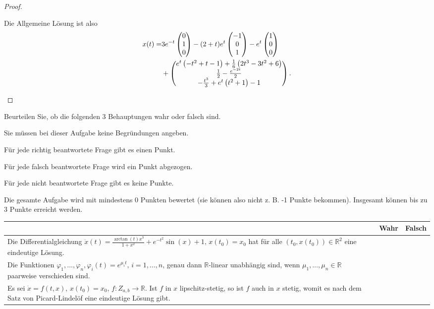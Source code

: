 \begin{proof}
\begin{parts}
Die Allgemeine L\"{o}sung ist also
\begin{align*}
	x(t)=&3e^{-t}\begin{pmatrix}
		0 \\ 1 \\ 0
	\end{pmatrix}-(2+t)e^{t}\begin{pmatrix}
		-1 \\ 0 \\ 1
	\end{pmatrix}-e^t \begin{pmatrix}
		1 \\ 0 \\ 0
	\end{pmatrix}\\
&+\begin{pmatrix}e^t \left(-t^2+t-1\right)+\frac{1}{6} \left(2 t^3-3 t^2+6\right)\\\frac{1}{2}-\frac{e^{-2 t}}{2}\\-\frac{t^3}{3}+e^t \left(t^2+1\right)-1\end{pmatrix}.\qedhere
\end{align*}
	\end{parts}
\end{proof}
\begin{Problem}
	Beurteilen Sie, ob die folgenden 3 Behauptungen wahr oder falsch sind.
	
	Sie müssen bei dieser Aufgabe keine Begründungen angeben.
	
	Für jede richtig beantwortete Frage gibt es einen Punkt.
	
	Für jede falsch beantwortete Frage wird ein Punkt abgezogen.
	
	Für jede nicht beantwortete Frage gibt es keine Punkte.
	
	Die gesamte Aufgabe wird mit mindestens 0 Punkten bewertet (sie können also nicht z. B. -1 Punkte bekommen). Insgesamt können bis zu 3 Punkte erreicht werden.
	
	\begin{tabularx}{\textwidth}{X|p{2cm}|p{2cm}|}
		& Wahr & Falsch \\\hline
		Die Differentialgleichung $\dot{x}(t) = \frac{\arctan(t)x^3}{1 + x^2} + e^{-t^2} \sin(x) + 1, \, x(t_0) = x_0$ hat für alle $(t_0, x(t_0)) \in \mathbb{R}^2$ eine eindeutige Lösung. & & \\\hline
	Die Funktionen $\varphi_1, \ldots, \varphi_n, \varphi_i(t) = e^{\mu_i t}, \, i = 1, \ldots, n$, genau dann $\mathbb{R}$-linear unabhängig sind, wenn $\mu_1, \ldots, \mu_n \in \mathbb{R}$ paarweise verschieden sind. & & \\\hline
		Es sei $\dot{x} = f(t, x), \, x(t_0) = x_0, \, f : Z_{a,b} \to \mathbb{R}$. Ist $f$ in $x$ lipschitz-stetig, so ist $f$ auch in $x$ stetig, womit es nach dem Satz von Picard-Lindelöf eine eindeutige Lösung gibt. & & \\\hline
	\end{tabularx}
\end{Problem}
